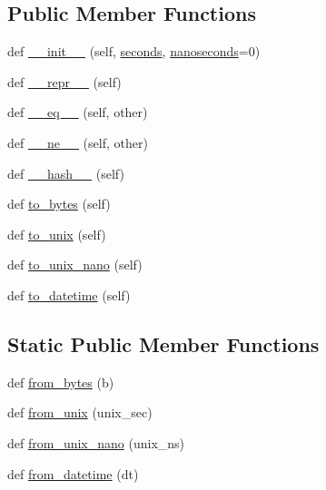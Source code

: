 \subsection*{Public Member Functions}
\begin{DoxyCompactItemize}
\item 
def \hyperlink{classpip_1_1__vendor_1_1msgpack_1_1ext_1_1Timestamp_ad71f01eebb6008ee9b7c7998207c6049}{\+\_\+\+\_\+init\+\_\+\+\_\+} (self, \hyperlink{classpip_1_1__vendor_1_1msgpack_1_1ext_1_1Timestamp_a402dde70e5dd6bfc4d783bb780a00c8f}{seconds}, \hyperlink{classpip_1_1__vendor_1_1msgpack_1_1ext_1_1Timestamp_a6445f24723dbb45fb5f6f7e527acf222}{nanoseconds}=0)
\item 
def \hyperlink{classpip_1_1__vendor_1_1msgpack_1_1ext_1_1Timestamp_a4adc139a53f42fa7a62ecb92cc64e0b1}{\+\_\+\+\_\+repr\+\_\+\+\_\+} (self)
\item 
def \hyperlink{classpip_1_1__vendor_1_1msgpack_1_1ext_1_1Timestamp_abba6737fdc132514c5817a421e43d60a}{\+\_\+\+\_\+eq\+\_\+\+\_\+} (self, other)
\item 
def \hyperlink{classpip_1_1__vendor_1_1msgpack_1_1ext_1_1Timestamp_a85bbfb0158c314f6747659d9d79fbc5f}{\+\_\+\+\_\+ne\+\_\+\+\_\+} (self, other)
\item 
def \hyperlink{classpip_1_1__vendor_1_1msgpack_1_1ext_1_1Timestamp_a1864c32d746d8b9331118ccc3344952b}{\+\_\+\+\_\+hash\+\_\+\+\_\+} (self)
\item 
def \hyperlink{classpip_1_1__vendor_1_1msgpack_1_1ext_1_1Timestamp_a7285a185b266aee511f617c196fa0136}{to\+\_\+bytes} (self)
\item 
def \hyperlink{classpip_1_1__vendor_1_1msgpack_1_1ext_1_1Timestamp_acc932f0c7c8c1a85ea4923433e7a02f1}{to\+\_\+unix} (self)
\item 
def \hyperlink{classpip_1_1__vendor_1_1msgpack_1_1ext_1_1Timestamp_a35e6bfd10cdc274a7221f11b23996f02}{to\+\_\+unix\+\_\+nano} (self)
\item 
def \hyperlink{classpip_1_1__vendor_1_1msgpack_1_1ext_1_1Timestamp_a39c65017f3feb922755eb646ef1d9d01}{to\+\_\+datetime} (self)
\end{DoxyCompactItemize}
\subsection*{Static Public Member Functions}
\begin{DoxyCompactItemize}
\item 
def \hyperlink{classpip_1_1__vendor_1_1msgpack_1_1ext_1_1Timestamp_a2550bdf0c1b253d92ad38772eabeb960}{from\+\_\+bytes} (b)
\item 
def \hyperlink{classpip_1_1__vendor_1_1msgpack_1_1ext_1_1Timestamp_a9ebe1ffed71a8f1497ba79de06c6a6ab}{from\+\_\+unix} (unix\+\_\+sec)
\item 
def \hyperlink{classpip_1_1__vendor_1_1msgpack_1_1ext_1_1Timestamp_a16b97511d73ae784ef855dd8d3d3c792}{from\+\_\+unix\+\_\+nano} (unix\+\_\+ns)
\item 
def \hyperlink{classpip_1_1__vendor_1_1msgpack_1_1ext_1_1Timestamp_a8e9cf6bd29b3dca3d767dab3f914a3f6}{from\+\_\+datetime} (dt)
\end{DoxyCompactItemize}
